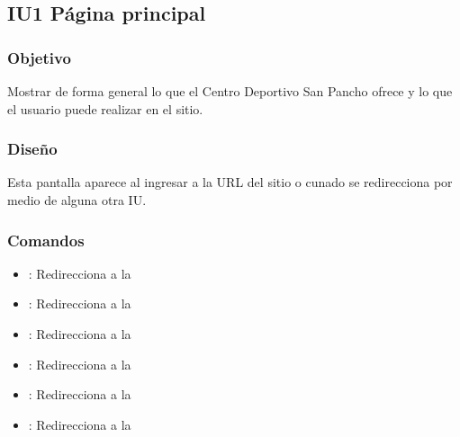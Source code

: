 \subsection{IU1 Página principal}

\subsubsection{Objetivo}
	Mostrar de forma general lo que el Centro Deportivo San Pancho ofrece y lo que el usuario puede realizar en el sitio.

\subsubsection{Diseño}
Esta pantalla aparece al ingresar a la URL del sitio o cunado se redirecciona por medio de alguna otra IU.


\subsubsection{Comandos}
\begin{itemize}
	\item {}: Redirecciona a la 
\end{itemize}

\begin{itemize}
	\item {}: Redirecciona a la  
\end{itemize}

\begin{itemize}
	\item {}: Redirecciona a la 
\end{itemize}

\begin{itemize}
	\item {}: Redirecciona a la 
\end{itemize}

\begin{itemize}
	\item {}: Redirecciona a la 
\end{itemize}

\begin{itemize}
	\item {}: Redirecciona a la 
\end{itemize}








